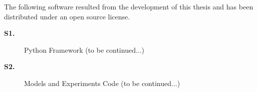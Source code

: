 The following software resulted from the development of this thesis and has been
distributed under an open source license.

\vspace{0.5cm}

\begin{description}

  \item[\textbf{S1.}] Python Framework (to be continued...)

  \item[\textbf{S2.}] Models and Experiments Code (to be continued...)
\end{description}